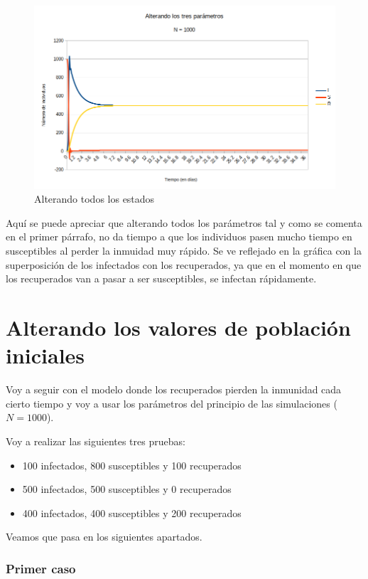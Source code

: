 \documentclass[11pt,a4paper]{report}
\begin{document}
\begin{figure}[H]
\centering
\includegraphics[width=\textwidth]{img/sin_inmunidad/alterado_all.png}
\caption{Alterando todos los estados}
\label{}
\end{figure}

Aquí se puede apreciar que alterando todos los parámetros tal y como se comenta en el primer párrafo, no da tiempo a que los individuos pasen mucho tiempo en susceptibles al perder la inmuidad muy rápido. Se ve reflejado en la gráfica con la superposición de los infectados con los recuperados, ya que en el momento en que los recuperados van a pasar a ser susceptibles, se infectan rápidamente.

\newpage
\section{Alterando los valores de población iniciales}

Voy a seguir con el modelo donde los recuperados pierden la inmunidad cada cierto tiempo y voy a usar los parámetros del principio de las simulaciones ($N = 1000$).

Voy a realizar las siguientes tres pruebas:

\begin{itemize}
	\item 100 infectados, 800 susceptibles y 100 recuperados
	\item 500 infectados, 500 susceptibles y 0 recuperados
	\item 400 infectados, 400 susceptibles y 200 recuperados
\end{itemize}

Veamos que pasa en los siguientes apartados.

\newpage
\subsubsection{Primer caso}
\end{document}
